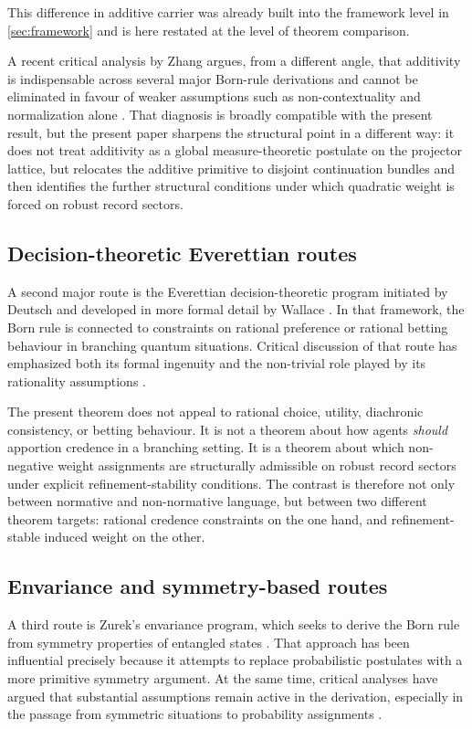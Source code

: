 \documentclass[11pt]{article}
\theoremstyle{remark}
\numberwithin{equation}{section}
\begin{document}
This difference in additive carrier was already built into the framework level in \cref{sec:framework} and is here restated at the level of theorem comparison.

A recent critical analysis by Zhang argues, from a different angle, that additivity is indispensable across several major Born-rule derivations and cannot be eliminated in favour of weaker assumptions such as non-contextuality and normalization alone \cite{Zhang2026Additivity}. That diagnosis is broadly compatible with the present result, but the present paper sharpens the structural point in a different way: it does not treat additivity as a global measure-theoretic postulate on the projector lattice, but relocates the additive primitive to disjoint continuation bundles and then identifies the further structural conditions under which quadratic weight is forced on robust record sectors.

\subsection{Decision-theoretic Everettian routes}

A second major route is the Everettian decision-theoretic program initiated by Deutsch and developed in more formal detail by Wallace \cite{Deutsch1999,Wallace2010,Wallace2012}. In that framework, the Born rule is connected to constraints on rational preference or rational betting behaviour in branching quantum situations. Critical discussion of that route has emphasized both its formal ingenuity and the non-trivial role played by its rationality assumptions \cite{Kent2010}.

The present theorem does not appeal to rational choice, utility, diachronic consistency, or betting behaviour. It is not a theorem about how agents \emph{should} apportion credence in a branching setting. It is a theorem about which non-negative weight assignments are structurally admissible on robust record sectors under explicit refinement-stability conditions. The contrast is therefore not only between normative and non-normative language, but between two different theorem targets: rational credence constraints on the one hand, and refinement-stable induced weight on the other.

\subsection{Envariance and symmetry-based routes}

A third route is Zurek's envariance program, which seeks to derive the Born rule from symmetry properties of entangled states \cite{Zurek2005}. That approach has been influential precisely because it attempts to replace probabilistic postulates with a more primitive symmetry argument. At the same time, critical analyses have argued that substantial assumptions remain active in the derivation, especially in the passage from symmetric situations to probability assignments \cite{SchlosshauerFine2005}.
\end{document}
